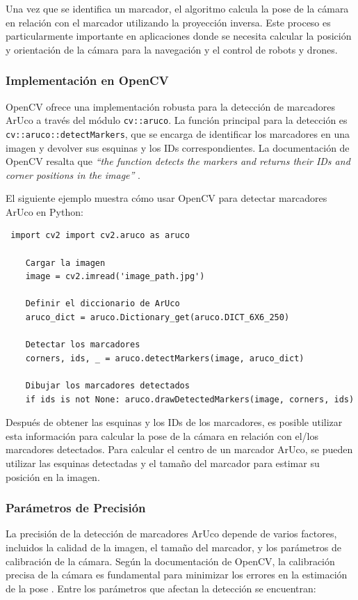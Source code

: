     Una vez que se identifica un marcador, el algoritmo calcula la pose de la cámara en relación con el marcador utilizando la proyección inversa. Este proceso es particularmente importante en aplicaciones donde se necesita calcular la posición y orientación de la cámara para la navegación y el control de robots y drones.

    \subsubsection{Implementación en OpenCV}

    OpenCV ofrece una implementación robusta para la detección de marcadores ArUco a través del módulo \texttt{cv::aruco}. La función principal para la detección es \texttt{cv::aruco::detectMarkers}, que se encarga de identificar los marcadores en una imagen y devolver sus esquinas y los IDs correspondientes. La documentación de OpenCV resalta que \textit{“the function detects the markers and returns their IDs and corner positions in the image”} \cite{opencv_tutorial_aruco}.

    El siguiente ejemplo muestra cómo usar OpenCV para detectar marcadores ArUco en Python:

    \begin{verbatim} import cv2 import cv2.aruco as aruco

    Cargar la imagen
    image = cv2.imread('image_path.jpg')

    Definir el diccionario de ArUco
    aruco_dict = aruco.Dictionary_get(aruco.DICT_6X6_250)

    Detectar los marcadores
    corners, ids, _ = aruco.detectMarkers(image, aruco_dict)

    Dibujar los marcadores detectados
    if ids is not None: aruco.drawDetectedMarkers(image, corners, ids) \end{verbatim}

    Después de obtener las esquinas y los IDs de los marcadores, es posible utilizar esta información para calcular la pose de la cámara en relación con el/los marcadores detectados. Para calcular el centro de un marcador ArUco, se pueden utilizar las esquinas detectadas y el tamaño del marcador para estimar su posición en la imagen.

    \subsubsection{Parámetros de Precisión}

    La precisión de la detección de marcadores ArUco depende de varios factores, incluidos la calidad de la imagen, el tamaño del marcador, y los parámetros de calibración de la cámara. Según la documentación de OpenCV, la calibración precisa de la cámara es fundamental para minimizar los errores en la estimación de la pose \cite{opencv_docs_aruco}. Entre los parámetros que afectan la detección se encuentran:

